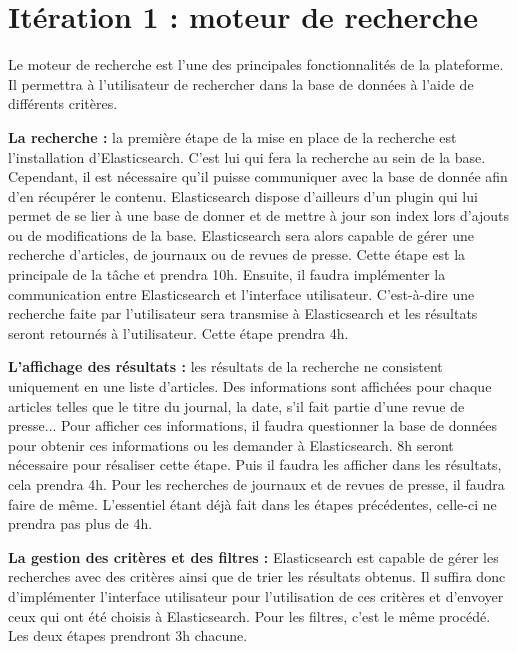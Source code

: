 \section{Itération 1 : moteur de recherche}

Le moteur de recherche est l'une des principales fonctionnalités de la plateforme. Il permettra à l'utilisateur de rechercher dans la base de données à l'aide de différents critères.

\textbf{La recherche :} la première étape de la mise en place de la recherche est l'installation d'Elasticsearch. C'est lui qui fera la recherche au sein de la base. Cependant, il est nécessaire qu'il puisse communiquer avec la base de donnée afin d'en récupérer le contenu. Elasticsearch dispose d'ailleurs d'un plugin qui lui permet de se lier à une base de donner et de mettre à jour son index lors d'ajouts ou de modifications de la base. Elasticsearch sera alors capable de gérer une recherche d'articles, de journaux ou de revues de presse. Cette étape est la principale de la tâche et prendra 10h. Ensuite, il faudra implémenter la communication entre Elasticsearch et l'interface utilisateur. C'est-à-dire une recherche faite par l'utilisateur sera transmise à Elasticsearch et les résultats seront retournés à l'utilisateur. Cette étape prendra 4h.

\textbf{L'affichage des résultats :} les résultats de la recherche ne consistent uniquement en une liste d'articles. Des informations sont affichées pour chaque articles telles que le titre du journal, la date, s'il fait partie d'une revue de presse... Pour afficher ces informations, il faudra questionner la base de données pour obtenir ces informations ou les demander à Elasticsearch. 8h seront nécessaire pour résaliser cette étape. Puis il faudra les afficher dans les résultats, cela prendra 4h. Pour les recherches de journaux et de revues de presse, il faudra faire de même. L'essentiel étant déjà fait dans les étapes précédentes, celle-ci ne prendra pas plus de 4h. 

\textbf{La gestion des critères et des filtres :} Elasticsearch est capable de gérer les recherches avec des critères ainsi que de trier les résultats obtenus.  Il suffira donc d'implémenter l'interface utilisateur pour l'utilisation de ces critères et d'envoyer ceux qui ont été choisis à Elasticsearch. Pour les filtres, c'est le même procédé. Les deux étapes prendront 3h chacune.
